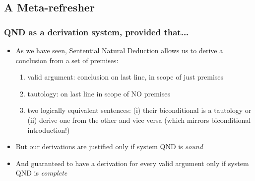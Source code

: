 \fi 


\iffalse %
\subsection{A Meta-refresher}

\begin{frame}
\frametitle{QND as a derivation system, provided that...}

\begin{itemize}[<+->]

\item As we have seen, Sentential Natural Deduction allows us to derive a conclusion from a set of premises:



\begin{enumerate}[1.)]

\item valid argument: conclusion on last line, in scope of just premises %

\item tautology: on last line in scope of NO premises %

\item two logically equivalent sentences: (i) their biconditional is a tautology or (ii) derive one from the other and vice versa (which mirrors biconditional introduction!)

\end{enumerate}

\item But our derivations are justified only if system QND is \textit{sound}

\item And guaranteed to have a derivation for every valid argument only if system QND is \textit{complete}




\end{itemize}
\end{frame}


